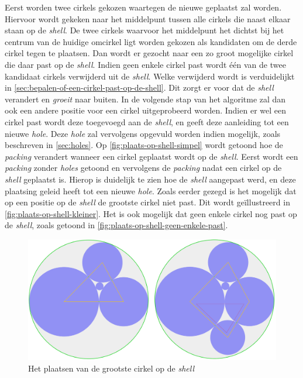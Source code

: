 \documentclass[12pt,a4paper,oneside]{book}
\begin{document}
Eerst worden twee cirkels gekozen waartegen de nieuwe geplaatst zal worden.
Hiervoor wordt gekeken naar het middelpunt tussen alle cirkels die naast elkaar staan op de \textit{shell}.
De twee cirkels waarvoor het middelpunt het dichtst bij het centrum van de huidige omcirkel ligt worden gekozen als kandidaten om de derde cirkel tegen te plaatsen.
Dan wordt er gezocht naar een zo groot mogelijke cirkel die daar past op de \textit{shell}.
Indien geen enkele cirkel past wordt één van de twee kandidaat cirkels verwijderd uit de \textit{shell}.
Welke verwijderd wordt is verduidelijkt in \autoref{sec:bepalen-of-een-cirkel-past-op-de-shell}.
Dit zorgt er voor dat de \textit{shell} verandert en \textit{groeit} naar buiten.
In de volgende stap van het algoritme zal dan ook een andere positie voor een cirkel uitgeprobeerd worden.
Indien er wel een cirkel past wordt deze toegevoegd aan de \textit{shell}, en geeft deze aanleiding tot een nieuwe \textit{hole}.
Deze \textit{hole} zal vervolgens opgevuld worden indien mogelijk, zoals beschreven in \autoref{sec:holes}.
Op \autoref{fig:plaats-op-shell-simpel} wordt getoond hoe de \textit{packing} verandert wanneer een cirkel geplaatst wordt op de \textit{shell}.
Eerst wordt een \textit{packing} zonder \textit{holes} getoond en vervolgens de \textit{packing} nadat een cirkel op de \textit{shell} geplaatst is.
Hierop is duidelijk te zien hoe de \textit{shell} aangepast werd, en deze plaatsing geleid heeft tot een nieuwe \textit{hole}.
Zoals eerder gezegd is het mogelijk dat op een positie op de \textit{shell} de grootste cirkel niet past.
Dit wordt geïllustreerd in \autoref{fig:plaats-op-shell-kleiner}.
Het is ook mogelijk dat geen enkele cirkel nog past op de \textit{shell}, zoals getoond in \autoref{fig:plaats-op-shell-geen-enkele-past}.

\begin{figure}
  \centering
  \includegraphics[width=1.0\textwidth]{plaats-op-shell-simpel.png}
  \caption{Het plaatsen van de grootste cirkel op de \textit{shell}} \label{fig:plaats-op-shell-simpel} 
\end{figure}
\end{document}

